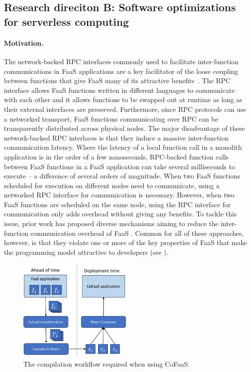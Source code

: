 \documentclass[../main.tex]{subfiles}
\begin{document}
\begin{refsection}
\section{Research direciton B: Software optimizations for serverless computing}

\paragraph{Motivation.}
The network-backed RPC interfaces commonly used to facilitate
inter-function communications in FaaS applications are a key
facilitator of the loose coupling between functions that give FaaS
many of its attractive
benefits~\cite{gan19_open_sourc_bench_suite_micros}. The RPC
interface allows FaaS functions written in different languages to
communicate with each other and it allows functions to be swapped out
at runtime as long as their external interfaces are
preserved. Furthermore, since RPC protocols can use a networked
transport, FaaS functions communicating over RPC can be transparently
distributed across physical nodes. The major disadvantage of these
network-backed RPC interlaces is that they induce a massive
inter-function communication latency. Where the latency of a local
function call in a monolith application is in the order of a few
nanoseconds, RPC-backed function calls between FaaS functions in a
FaaS application can take several milliseconds to execute -- a
difference of several orders of magnitude. When two FaaS functions
scheduled for execution on different nodes need to communicate, using
a networked RPC interface for communication is necessary. However,
when two FaaS functions are scheduled on the same node, using the RPC
interface for communication only adds overhead without giving any
benefits. To tackle this issue, prior work has proposed diverse
mechanisms aiming to reduce the inter-function communication overhead
of FaaS \cite{kotni21_faast,
  mahgoub22_wisef,barcelona-pons19_faas_track,sreekanti20_cloud,shillaker20_faasm,jia21_night}.
Common for all of these approaches, however, is that they violate one
or more of the key properties of FaaS that make the programming model
attractive to developers (see ).


\begin{figure}[ht]
  \centering
  \includegraphics[width=0.5\textwidth]{papers/paper5-cofaas/figures/cofaas_compilation.pdf}
  \caption{\label{fig:cofaas-comp} The compilation workflow required when using CoFaaS.}
\end{figure}




\end{refsection}
\end{document}
